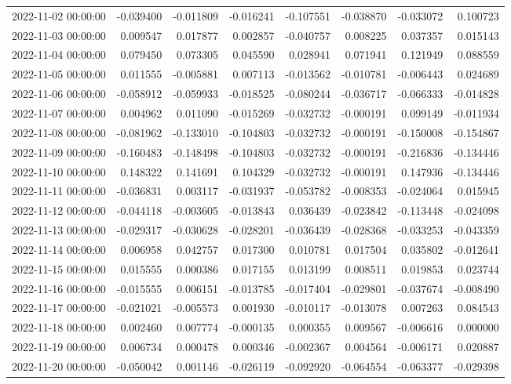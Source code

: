 \begin{tabular}{lrrrrrrr}
2022-11-02 00:00:00 & -0.039400 & -0.011809 & -0.016241 & -0.107551 & -0.038870 & -0.033072 & 0.100723 \\
2022-11-03 00:00:00 & 0.009547 & 0.017877 & 0.002857 & -0.040757 & 0.008225 & 0.037357 & 0.015143 \\
2022-11-04 00:00:00 & 0.079450 & 0.073305 & 0.045590 & 0.028941 & 0.071941 & 0.121949 & 0.088559 \\
2022-11-05 00:00:00 & 0.011555 & -0.005881 & 0.007113 & -0.013562 & -0.010781 & -0.006443 & 0.024689 \\
2022-11-06 00:00:00 & -0.058912 & -0.059933 & -0.018525 & -0.080244 & -0.036717 & -0.066333 & -0.014828 \\
2022-11-07 00:00:00 & 0.004962 & 0.011090 & -0.015269 & -0.032732 & -0.000191 & 0.099149 & -0.011934 \\
2022-11-08 00:00:00 & -0.081962 & -0.133010 & -0.104803 & -0.032732 & -0.000191 & -0.150008 & -0.154867 \\
2022-11-09 00:00:00 & -0.160483 & -0.148498 & -0.104803 & -0.032732 & -0.000191 & -0.216836 & -0.134446 \\
2022-11-10 00:00:00 & 0.148322 & 0.141691 & 0.104329 & -0.032732 & -0.000191 & 0.147936 & -0.134446 \\
2022-11-11 00:00:00 & -0.036831 & 0.003117 & -0.031937 & -0.053782 & -0.008353 & -0.024064 & 0.015945 \\
2022-11-12 00:00:00 & -0.044118 & -0.003605 & -0.013843 & 0.036439 & -0.023842 & -0.113448 & -0.024098 \\
2022-11-13 00:00:00 & -0.029317 & -0.030628 & -0.028201 & -0.036439 & -0.028368 & -0.033253 & -0.043359 \\
2022-11-14 00:00:00 & 0.006958 & 0.042757 & 0.017300 & 0.010781 & 0.017504 & 0.035802 & -0.012641 \\
2022-11-15 00:00:00 & 0.015555 & 0.000386 & 0.017155 & 0.013199 & 0.008511 & 0.019853 & 0.023744 \\
2022-11-16 00:00:00 & -0.015555 & 0.006151 & -0.013785 & -0.017404 & -0.029801 & -0.037674 & -0.008490 \\
2022-11-17 00:00:00 & -0.021021 & -0.005573 & 0.001930 & -0.010117 & -0.013078 & 0.007263 & 0.084543 \\
2022-11-18 00:00:00 & 0.002460 & 0.007774 & -0.000135 & 0.000355 & 0.009567 & -0.006616 & 0.000000 \\
2022-11-19 00:00:00 & 0.006734 & 0.000478 & 0.000346 & -0.002367 & 0.004564 & -0.006171 & 0.020887 \\
2022-11-20 00:00:00 & -0.050042 & 0.001146 & -0.026119 & -0.092920 & -0.064554 & -0.063377 & -0.029398 \\

\end{tabular}
